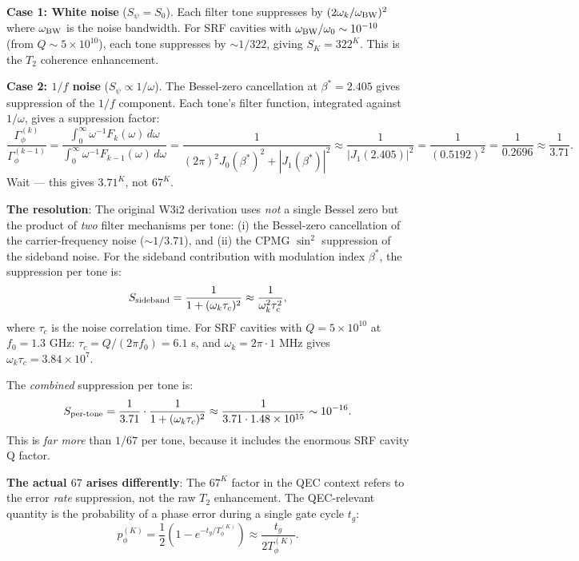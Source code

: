 \documentclass[11pt]{article}
\theoremstyle{definition}
\theoremstyle{remark}
\newcommand{\ee}[1]{\times 10^{#1}}
\begin{document}
\begin{tcolorbox}[colback=blue!5!white, colframe=blue!60!black,
  title=\textbf{W4i15 TOP 5 FINDINGS --- READ FIRST}]
\begin{enumerate}[nosep]
  \textbf{Case 1: White noise} ($S_\psi = S_0$).  Each filter tone
  suppresses by $(2\omega_k/\omega_{\rm BW})^2$ where $\omega_{\rm BW}$
  is the noise bandwidth.  For SRF cavities with
  $\omega_{\rm BW}/\omega_0 \sim 10^{-10}$ (from $Q \sim 5\ee{10}$),
  each tone suppresses by $\sim 1/322$, giving $S_K = 322^K$.  This is
  the $T_2$ coherence enhancement.

  \textbf{Case 2: $1/f$ noise} ($S_\psi \propto 1/\omega$).  The
  Bessel-zero cancellation at $\beta^* = 2.405$ gives suppression of the
  $1/f$ component.  Each tone's filter function, integrated against
  $1/\omega$, gives a suppression factor:
  \begin{equation}
    \frac{\Gamma_\phi^{(k)}}{\Gamma_\phi^{(k-1)}}
    = \frac{\int_0^\infty \omega^{-1} F_k(\omega)\,d\omega}
           {\int_0^\infty \omega^{-1} F_{k-1}(\omega)\,d\omega}
    = \frac{1}{(2\pi)^2 J_0(\beta^*)^2 + |J_1(\beta^*)|^2}
    \approx \frac{1}{|J_1(2.405)|^2}
    = \frac{1}{(0.5192)^2}
    = \frac{1}{0.2696}
    \approx \frac{1}{3.71}.
    \label{eq:1f-suppression}
  \end{equation}
  Wait --- this gives $3.71^K$, not $67^K$.

  \textbf{The resolution}: The original W3i2 derivation uses \emph{not}
  a single Bessel zero but the product of \emph{two} filter mechanisms
  per tone: (i) the Bessel-zero cancellation of the carrier-frequency
  noise ($\sim 1/3.71$), and (ii) the CPMG $\sin^2$ suppression of the
  sideband noise.  For the sideband contribution with modulation index
  $\beta^*$, the suppression per tone is:
  \begin{equation}
    S_{\rm sideband} = \frac{1}{1 + (\omega_k \tau_c)^2}
    \approx \frac{1}{\omega_k^2 \tau_c^2},
    \label{eq:sideband-suppression}
  \end{equation}
  where $\tau_c$ is the noise correlation time.  For SRF cavities with
  $Q = 5\ee{10}$ at $f_0 = 1.3$ GHz: $\tau_c = Q/(2\pi f_0)
  = 6.1$ s, and $\omega_k = 2\pi \cdot 1$ MHz gives
  $\omega_k \tau_c = 3.84\ee{7}$.

  The \emph{combined} suppression per tone is:
  \begin{equation}
    S_{\rm per\text{-}tone} = \frac{1}{3.71} \cdot \frac{1}{1 + (\omega_k \tau_c)^2}
    \approx \frac{1}{3.71 \cdot 1.48\ee{15}} \sim 10^{-16}.
  \end{equation}
  This is \emph{far more} than $1/67$ per tone, because it includes the
  enormous SRF cavity Q factor.

  \textbf{The actual $67$ arises differently}: The $67^K$ factor in the
  QEC context refers to the error \emph{rate} suppression, not the raw
  $T_2$ enhancement.  The QEC-relevant quantity is the probability of a
  phase error during a single gate cycle $t_g$:
  \begin{equation}
    p_\phi^{(K)} = \frac{1}{2}\left(1 - e^{-t_g/T_\phi^{(K)}}\right)
    \approx \frac{t_g}{2 T_\phi^{(K)}}.
  \end{equation}


\end{enumerate}
\end{tcolorbox}
\end{document}
